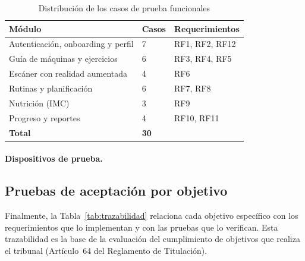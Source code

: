 \begin{table}[H]
\centering
\caption{Distribución de los casos de prueba funcionales}
\label{tab:resumen-funcionales}
\begin{tabular}{|L{6cm}|C{2.5cm}|C{2.8cm}|}
\hline
{} \textbf{Módulo} & \textbf{Casos} & \textbf{Requerimientos} \\
\hline
Autenticación, onboarding y perfil & 7 & RF1, RF2, RF12 \\ \hline
Guía de máquinas y ejercicios & 6 & RF3, RF4, RF5 \\ \hline
Escáner con realidad aumentada & 4 & RF6 \\ \hline
Rutinas y planificación & 6 & RF7, RF8 \\ \hline
Nutrición (IMC) & 3 & RF9 \\ \hline
Progreso y reportes & 4 & RF10, RF11 \\
\hline
\textbf{Total} & \textbf{30} & \\
\hline
\end{tabular}
\end{table}

\paragraph{Dispositivos de prueba.} 

\subsection{Pruebas de aceptación por objetivo}

Finalmente, la Tabla~\ref{tab:trazabilidad} relaciona cada objetivo
específico con los requerimientos que lo implementan y con las pruebas que lo
verifican. Esta trazabilidad es la base de la evaluación del cumplimiento de
objetivos que realiza el tribunal (Artículo~64 del Reglamento de Titulación).

